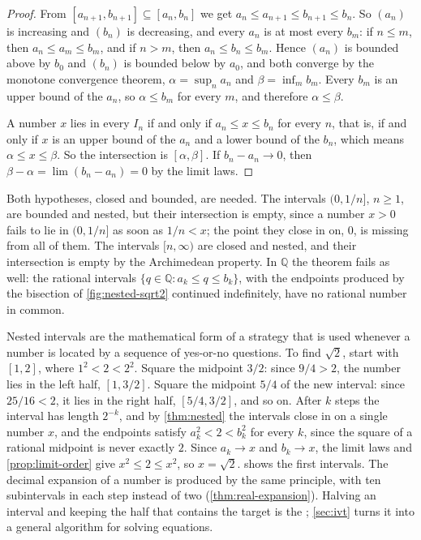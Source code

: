 \begin{proof}
From $[a_{n+1},b_{n+1}]\subseteq[a_n,b_n]$ we get $a_n\le a_{n+1}\le b_{n+1}\le b_n$. So $(a_n)$ is increasing and $(b_n)$ is decreasing, and every $a_n$ is at most every $b_m$: if $n\le m$, then $a_n\le a_m\le b_m$, and if $n>m$, then $a_n\le b_n\le b_m$. Hence $(a_n)$ is bounded above by $b_0$ and $(b_n)$ is bounded below by $a_0$, and both converge by the monotone convergence theorem, $\alpha=\sup_na_n$ and $\beta=\inf_mb_m$. Every $b_m$ is an upper bound of the $a_n$, so $\alpha\le b_m$ for every $m$, and therefore $\alpha\le\beta$.

A number $x$ lies in every $I_n$ if and only if $a_n\le x\le b_n$ for every $n$, that is, if and only if $x$ is an upper bound of the $a_n$ and a lower bound of the $b_n$, which means $\alpha\le x\le\beta$. So the intersection is $[\alpha,\beta]$. If $b_n-a_n\to0$, then $\beta-\alpha=\lim(b_n-a_n)=0$ by the limit laws.
\end{proof}

Both hypotheses, closed and bounded, are needed. The intervals $(0,1/n]$, $n\ge1$, are bounded and nested, but their intersection is empty, since a number $x>0$ fails to lie in $(0,1/n]$ as soon as $1/n<x$; the point they close in on, $0$, is missing from all of them. The intervals $[n,\infty)$ are closed and nested, and their intersection is empty by the Archimedean property. In $\mathbb Q$ the theorem fails as well: the rational intervals $\{q\in\mathbb Q: a_k\le q\le b_k\}$, with the endpoints produced by the bisection of \cref{fig:nested-sqrt2} continued indefinitely, have no rational number in common.

Nested intervals are the mathematical form of a strategy that is used whenever a number is located by a sequence of yes-or-no questions. To find $\sqrt2$, start with $[1,2]$, where $1^2<2<2^2$. Square the midpoint $3/2$: since $9/4>2$, the number lies in the left half, $[1,3/2]$. Square the midpoint $5/4$ of the new interval: since $25/16<2$, it lies in the right half, $[5/4,3/2]$, and so on. After $k$ steps the interval has length $2^{-k}$, and by \cref{thm:nested} the intervals close in on a single number $x$, and the endpoints satisfy $a_k^2<2<b_k^2$ for every $k$, since the square of a rational midpoint is never exactly $2$. Since $a_k\to x$ and $b_k\to x$, the limit laws and \cref{prop:limit-order} give $x^2\le2\le x^2$, so $x=\sqrt2$.  shows the first intervals. The decimal expansion of a number is produced by the same principle, with ten subintervals in each step instead of two (\cref{thm:real-expansion}). Halving an interval and keeping the half that contains the target is the ; \cref{sec:ivt} turns it into a general algorithm for solving equations.

